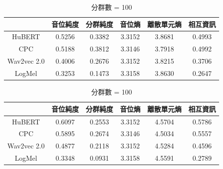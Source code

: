 {

\begin{table}[!htbp]
    \centering
    \begin{subtable}[t]{\textwidth}
        \centering
        \begin{tabular}{|c|c|c|c|c|c|} \hline
                        & 音位純度   & 分群純度   & 音位熵    & 離散單元熵  & 相互資訊   \\ \hline
            HuBERT      &     0.5256 &     0.3382 &    3.3152 &      3.8681 & 0.4993 \\ \hline    %
            CPC         &     0.5188 &     0.3812 &    3.3146 &      3.7918 & 0.4992 \\ \hline    %
            Wav2vec 2.0 &     0.4006 &     0.2676 &    3.3152 &      3.8215 & 0.3706 \\ \hline    %
            LogMel      &     0.3253 &     0.1473 &    3.3158 &      3.8630 & 0.2647 \\ \hline    %
        \end{tabular}
        \caption{分群數 = 50}
        \label{tab:ch3-clu050-phn}
    \end{subtable}

    \vspace{0.5cm}

    \begin{subtable}[t]{\textwidth}
        \centering
        \begin{tabular}{|c|c|c|c|c|c|} \hline
                        & 音位純度   & 分群純度   & 音位熵    & 離散單元熵  & 相互資訊   \\ \hline
            HuBERT      &     0.6097 &     0.2553 &    3.3152 &      4.5704 & 0.5786 \\ \hline    %
            CPC         &     0.5895 &     0.2674 &    3.3146 &      4.5034 & 0.5557 \\ \hline    %
            Wav2vec 2.0 &     0.4877 &     0.2118 &    3.3152 &      4.5284 & 0.4596 \\ \hline    %
            LogMel      &     0.3348 &     0.0931 &    3.3158 &      4.5591 & 0.2789 \\ \hline    %
        \end{tabular}
        \caption{分群數 = 100}
        \label{tab:ch3-clu100-phn}
    \end{subtable}

    \vspace{0.5cm}


\end{table}}

